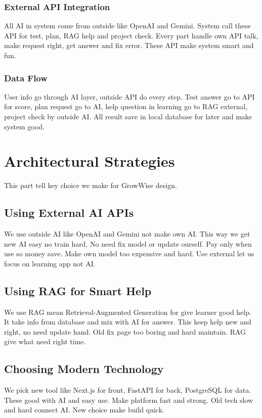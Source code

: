 \documentclass{FastFyp}
\begin{document}
\subsubsection{External API Integration}
All AI in system come from outside like OpenAI and Gemini. System call these API for test, plan, RAG help and project check. Every part handle own API talk, make request right, get answer and fix error. These API make system smart and fun.

\subsubsection{Data Flow}
User info go through AI layer, outside API do every step. Test answer go to API for score, plan request go to AI, help question in learning go to RAG external, project check by outside AI. All result save in local database for later and make system good.

\section{Architectural Strategies}
This part tell key choice we make for GrowWise design.

\subsection{Using External AI APIs}
We use outside AI like OpenAI and Gemini not make own AI. This way we get new AI easy no train hard. No need fix model or update ourself. Pay only when use so money save.
Make own model too expensive and hard. Use external let us focus on learning app not AI.

\subsection{Using RAG for Smart Help}
We use RAG mean Retrieval-Augmented Generation for give learner good help. It take info from database and mix with AI for answer. This keep help new and right, no need update hand.
Old fix page too boring and hard maintain. RAG give what need right time.

\subsection{Choosing Modern Technology}
We pick new tool like Next.js for front, FastAPI for back, PostgreSQL for data. These good with AI and easy use. Make platform fast and strong.
Old tech slow and hard connect AI. New choice make build quick.
\end{document}
